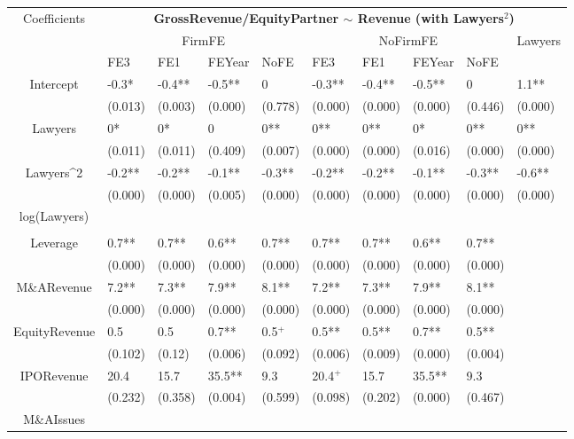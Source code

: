 \documentclass{article}
\begin{document}
\begin{table}[H]
\centering
\begin{tabular}{|clllllllll|}
\hline
\multirow{3}{*}{Coefficients} & \multicolumn{9}{c|}{\textbf{GrossRevenue/EquityPartner $\sim$ Revenue (with Lawyers$^2$)}} \\
\cline{2-10}
& \multicolumn{4}{c}{FirmFE} & \multicolumn{4}{c}{NoFirmFE} & \multirow{2}{*}{Lawyers} \\
\cline{2-9}
& FE3 & FE1 & FEYear & NoFE & FE3 & FE1 & FEYear & NoFE &  \\
\hline
 
Intercept & -0.3* & -0.4** & -0.5** & 0 & -0.3** & -0.4** & -0.5** & 0 & 1.1** \\ 
   & (0.013) & (0.003) & (0.000) & (0.778) & (0.000) & (0.000) & (0.000) & (0.446) & (0.000) \\ 
  Lawyers & 0* & 0* & 0 & 0** & 0** & 0** & 0* & 0** & 0** \\ 
   & (0.011) & (0.011) & (0.409) & (0.007) & (0.000) & (0.000) & (0.016) & (0.000) & (0.000) \\ 
  Lawyers^2 & -0.2** & -0.2** & -0.1** & -0.3** & -0.2** & -0.2** & -0.1** & -0.3** & -0.6** \\ 
   & (0.000) & (0.000) & (0.005) & (0.000) & (0.000) & (0.000) & (0.000) & (0.000) & (0.000) \\ 
  log(Lawyers) &  &  &  &  &  &  &  &  &  \\ 
   &  &  &  &  &  &  &  &  &  \\ 
  Leverage & 0.7** & 0.7** & 0.6** & 0.7** & 0.7** & 0.7** & 0.6** & 0.7** &  \\ 
   & (0.000) & (0.000) & (0.000) & (0.000) & (0.000) & (0.000) & (0.000) & (0.000) &  \\ 
  M\&ARevenue & 7.2** & 7.3** & 7.9** & 8.1** & 7.2** & 7.3** & 7.9** & 8.1** &  \\ 
   & (0.000) & (0.000) & (0.000) & (0.000) & (0.000) & (0.000) & (0.000) & (0.000) &  \\ 
  EquityRevenue & 0.5 & 0.5 & 0.7** & 0.5$^{+}$ & 0.5** & 0.5** & 0.7** & 0.5** &  \\ 
   & (0.102) & (0.12) & (0.006) & (0.092) & (0.006) & (0.009) & (0.000) & (0.004) &  \\ 
  IPORevenue & 20.4 & 15.7 & 35.5** & 9.3 & 20.4$^{+}$ & 15.7 & 35.5** & 9.3 &  \\ 
   & (0.232) & (0.358) & (0.004) & (0.599) & (0.098) & (0.202) & (0.000) & (0.467) &  \\ 
  M\&AIssues &  &  &  &  &  &  &  &  &  \\ 

\end{tabular}
\end{table}
\end{document}
